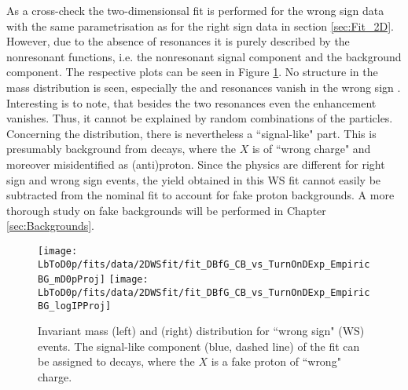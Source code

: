 As a cross-check the two-dimensionsal fit is performed for the wrong sign data with the same parametrisation as for the right sign data in section \ref{sec:Fit_2D}.
However, due to the absence of resonances it is purely described by the nonresonant functions, i.e. the nonresonant signal component and the background component.
The respective plots can be seen in Figure \ref{fig:fit_2D_WS}. 
No structure in the mass distribution is seen, especially the \LcResI and \LcResII resonances vanish in the wrong sign \Dz\proton.
Interesting is to note, that besides the two resonances even the enhancement vanishes.
Thus, it cannot be explained by random combinations of the particles.
Concerning the \logIP distribution, there is nevertheless a ``signal-like" part. 
This is presumably background from \BToDmunuX decays, where the $X$ is of ``wrong charge" and moreover misidentified as (anti)proton.
Since the physics are different for right sign and wrong sign events, the yield obtained in this WS fit cannot easily be subtracted from the nominal fit to account for fake proton backgrounds.
A more thorough study on fake backgrounds will be performed in Chapter \ref{sec:Backgrounds}.
\begin{figure}[tb]
	\centering
	\texttt{[image: LbToD0p/fits/data/2DWSfit/fit\_DBfG\_CB\_vs\_TurnOnDExp\_EmpiricBG\_mD0pProj]}
	\texttt{[image: LbToD0p/fits/data/2DWSfit/fit\_DBfG\_CB\_vs\_TurnOnDExp\_EmpiricBG\_logIPProj]}
	\caption{Invariant \Dz\proton mass (left) and \logIP (right) distribution for ``wrong sign" (WS) events.
             The signal-like component (blue, dashed line) of the fit can be assigned to \BToDmunuX decays, where the $X$ is a fake proton of ``wrong" charge.}
	\label{fig:fit_2D_WS}
\end{figure}


